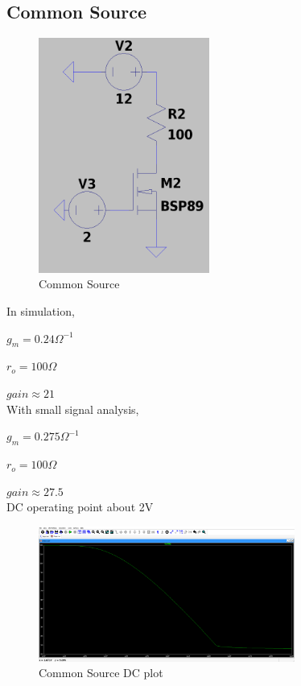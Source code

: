 \documentclass{article}
\begin{document}
\subsection{Common Source}

\begin{figure}[H]
    \centering
    \includegraphics[width=0.5\textwidth]{CommonSource.jpg}
    \caption{Common Source}
\end{figure}

In simulation,

$g_m = 0.24\Omega^{-1}$

$r_o = 100\Omega$

$gain \approx 21$\\
With small signal analysis,

$g_m = 0.275\Omega^{-1}$

$r_o = 100\Omega$

$gain \approx 27.5$\\
DC operating point about 2V

\begin{figure}[H]
    \centering
    \includegraphics[width=0.75\textwidth]{CommonSourcePlot.jpg}
    \caption{Common Source DC plot}
\end{figure}
\end{document}

